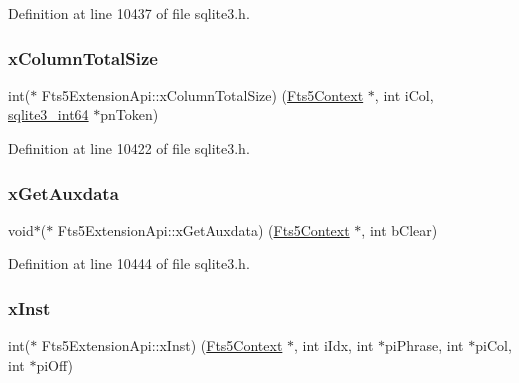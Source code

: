Definition at line 10437 of file sqlite3.\+h.

\mbox{\label{struct_fts5_extension_api_a096e79406ae03df9796a2082d0ac8269}} 
\subsubsection{\texorpdfstring{x\+Column\+Total\+Size}{xColumnTotalSize}}
{\footnotesize\ttfamily int($\ast$ Fts5\+Extension\+Api\+::x\+Column\+Total\+Size) (\mbox{\hyperlink{sqlite3_8h_a97821b95ebebd43db901977ffd5b26bc}{Fts5\+Context}} $\ast$, int i\+Col, \mbox{\hyperlink{sqlite3_8h_a0a4d3e6c1ad46f90e746b920ab6ca0d2}{sqlite3\+\_\+int64}} $\ast$pn\+Token)}



Definition at line 10422 of file sqlite3.\+h.

\mbox{\label{struct_fts5_extension_api_a63ba9aaf30fe9fe5fbcd1541ff38abff}} 
\subsubsection{\texorpdfstring{x\+Get\+Auxdata}{xGetAuxdata}}
{\footnotesize\ttfamily void$\ast$($\ast$ Fts5\+Extension\+Api\+::x\+Get\+Auxdata) (\mbox{\hyperlink{sqlite3_8h_a97821b95ebebd43db901977ffd5b26bc}{Fts5\+Context}} $\ast$, int b\+Clear)}



Definition at line 10444 of file sqlite3.\+h.

\mbox{\label{struct_fts5_extension_api_a85e17f20db782b20b503f1d803a47a9e}} 
\subsubsection{\texorpdfstring{x\+Inst}{xInst}}
{\footnotesize\ttfamily int($\ast$ Fts5\+Extension\+Api\+::x\+Inst) (\mbox{\hyperlink{sqlite3_8h_a97821b95ebebd43db901977ffd5b26bc}{Fts5\+Context}} $\ast$, int i\+Idx, int $\ast$pi\+Phrase, int $\ast$pi\+Col, int $\ast$pi\+Off)}



